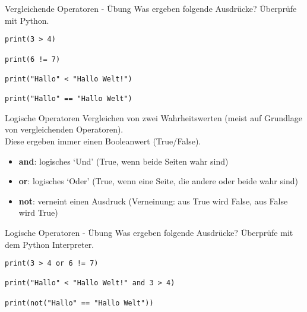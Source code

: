 \begin{frame}[fragile]{Vergleichende Operatoren - Übung}
Was ergeben folgende Ausdrücke? Überprüfe mit Python.

\begin{lstlisting} 
print(3 > 4) 

print(6 != 7)

print("Hallo" < "Hallo Welt!") 

print("Hallo" == "Hallo Welt")

\end{lstlisting}
\end{frame}



\begin{frame}[fragile]{Logische Operatoren}
Vergleichen von zwei Wahrheitswerten (meist auf Grundlage von vergleichenden Operatoren).\\
Diese ergeben immer einen Booleanwert (True/False).

\begin{itemize}	
\item \textbf{and}:  logisches `Und' (True, wenn beide Seiten wahr sind)
\item \textbf{or}: logisches `Oder' (True, wenn eine Seite, die andere oder beide wahr sind)
\item \textbf{not}:  verneint einen Ausdruck (Verneinung: aus True wird False, aus False wird True)
\end{itemize}
\end{frame}

\begin{frame}[fragile]{Logische Operatoren - Übung}
Was ergeben folgende Ausdrücke? Überprüfe mit dem Python Interpreter.

\begin{lstlisting} 
print(3 > 4 or 6 != 7)

print("Hallo" < "Hallo Welt!" and 3 > 4)

print(not("Hallo" == "Hallo Welt"))
\end{lstlisting}
\end{frame}







